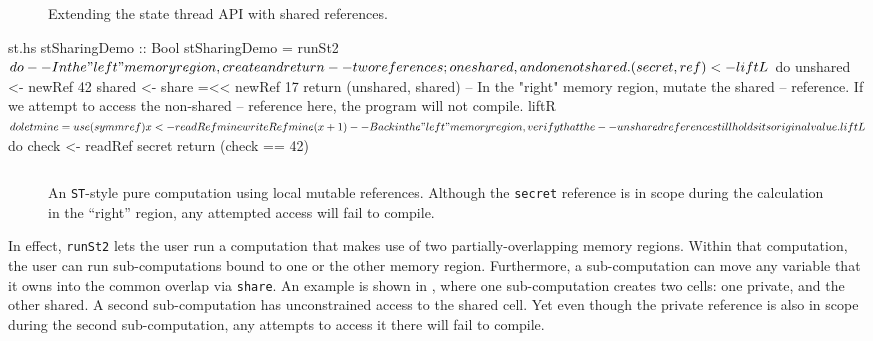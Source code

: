 \documentclass[format=sigplan, review=false, screen=true, 10pt]{acmart}
\makeatletter
\let\origsection\section
\renewcommand\section{\@ifstar{\starsection}{\nostarsection}}
\newcommand\nostarsection[1]
{\sectionprelude\origsection{#1}\sectionpostlude}
\newcommand\starsection[1]
{\sectionprelude\origsection*{#1}\sectionpostlude}
\newcommand\sectionprelude{%
  \vspace{-0.5em}
}
\newcommand\sectionpostlude{%
  \vspace{0em}
}
\makeatother
\begin{document}
\begin{figure}[b]
  \inputminted{haskell}{st2.hs}
  \caption{Extending the state thread API with shared references.\label{st-sharing-api}}
\end{figure}

\begin{filecontents*}{st.hs}
stSharingDemo :: Bool
stSharingDemo = runSt2 $ do
  -- In the "left" memory region, create and return
  -- two references; one shared, and one not shared.
  (secret, ref) <- liftL $ do
      unshared <- newRef 42
      shared   <- share =<< newRef 17
      return (unshared, shared)
  -- In the "right" memory region, mutate the shared
  -- reference. If we attempt to access the non-shared
  -- reference here, the program will not compile.
  liftR $ do
      let mine = use (symm ref)
      x <- readRef mine
      writeRef mine (x + 1)
  -- Back in the "left" memory region, verify that the
  -- unshared reference still holds its original value.
  liftL $ do
      check <- readRef secret
      return (check == 42)
\end{filecontents*}

\begin{figure}
  \inputminted{haskell}{st.hs}
  \caption{An \texttt{ST}-style pure computation using local mutable
    references. 
    Although the \texttt{secret} reference is in scope during the calculation
    in the ``right'' region, any attempted access will fail to compile.\label{st-example}}
\end{figure}

In effect, \texttt{runSt2} lets the user run a computation that makes use of
two partially-overlapping memory regions. Within that computation, the user
can run sub-computations bound to one or the other memory region. Furthermore,
a sub-computation can move any variable that it owns into the common overlap
via \texttt{share}. An example is shown in , where one sub-computation
creates two cells: one private, and the other shared. A second sub-computation has unconstrained
access to the shared cell. Yet even though the private reference is also in scope during
the second sub-computation, any attempts to access it there will fail to compile.

\section{Case Study \#3: Key-value Lookups}
\end{document}
